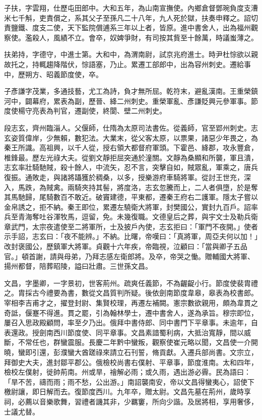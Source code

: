 \begin{pinyinscope}
 子扶，字雲翔，仕歷屯田郎中。大和五年，為山南宣撫使。內鄉倉督鄧琬負度支漕米七千斛，吏責償之，系其父子至孫凡二十八年，九人死於獄，扶奏申釋之。詔切責鹽鐵、度支二使，天下監院償逋系三年以上者，皆原。進中書舍人，出為福州觀察使。濫殺人，風績不立。會卒，奴婢爭財，有司按其貲至十餘萬，時議蚩薄之。



 扶弟持，字德守，中進士第。大和中，為渭南尉，試京兆府進士。時尹杜悰欲以親故托之，持輒趨降階伏，悰語塞，乃止。累遷工部郎中，出為容州刺史。遷給事中，歷朔方、昭義節度使，卒。



 子彥謙字茂業，多通技藝，尤工為詩，負才無所屈。乾符末，避亂漢南。王重榮鎮河中，闢幕府，累表為副，歷晉、絳二州刺史。重榮軍亂、彥謙貶興元參軍事。節度使楊守亮表為判官，遷副使，終閬、壁二州刺史。



 段志玄，齊州臨淄人。父偃師，仕隋為太原司法書佐。從義師，官至郢州刺史。志玄姿質偉岸，少無賴，數犯法。大業末，從父客太原，以票果，諸惡少年畏之，為秦王所識。高祖興，以千人從，授右領大都督府軍頭。下霍邑、絳郡，攻永豐倉，椎鋒最。歷左光祿大夫。從劉文靜拒屈突通於潼關。文靜為桑顯和所襲，軍且潰，志玄率壯騎馳賊，殺十餘人，中流矢，忍不言，突擊自如，賊眾亂，軍乘之，唐兵復振。通敗走，與諸將躡獲於稠桑，以多，授樂游府車騎將軍。從討王世充，深入，馬跌，為賊禽。兩騎夾持其髻，將度洛，志玄忽騰而上，二人者俱墮，於是奪其馬馳歸，尾騎數百不敢近。破竇建德，平東都，遷秦王府右二護軍。隱太子嘗以金帛誘之，拒不納。秦王即位，累遷左驍衛大將軍，封樊國公，實封九百戶。詔率兵至青海奪吐谷渾牧馬，逗留，免。未幾復職。文德皇后之葬，與宇文士及勒兵衛章武門，太宗夜遣使至二將軍所，士及披戶內使，志玄拒曰：「軍門不夜開。」使者示手詔，志玄曰：「夜不能辨。」不納。比曙，帝嘆曰：「真將軍，周亞夫何以加！」改封褒國公，歷鎮軍大將軍。貞觀十六年疾，帝臨視，泣顧曰：「當與卿子五品官。」頓首謝，請與母弟，乃拜志感左衛郎將。及卒，帝哭之慟。贈輔國大將軍、揚州都督，陪葬昭陵，謚曰壯肅。三世孫文昌。



 文昌，字墨卿，一字景初，世客荊州。疏爽任義節，不為齷齪小行。節度使裴胄禮之。胄採古今禮要為書，數從文昌質判所疑。後依劍南節度韋皋，皋表為校書郎。宰相李吉甫才之，擢登封尉、集賢校理，再遷左補闕。憲宗數欲親用，頗為韋貫之奇詆，偃蹇不得進。貫之罷，引為翰林學士，遷中書舍人，遂為承旨。穆宗即位，屢召入思政殿顧問，率至夕乃出。俄拜中書侍郎、同中書門下平章事。未逾年，自表還政。授劍南西川節度使、同平章事。文昌素諳蜀利病，大抵治寬靜，間以威斷，不常任也，群蠻震服。長慶二年黔中蠻叛，觀察使崔元略以聞，文昌使一介開曉，蠻即引還，彭濮蠻大酋蹉祿來請立石刊誓，脩貢獻。入遷兵部尚書。文宗立，拜御史大夫，進封鄒平郡公。俄檢校尚書右僕射、平章事，節度淮南。太和四年，檢校左僕射，徙帥荊南。州或旱，禬解必雨；或久雨，遇出游必霽。民為語曰：「旱不苦，禱而雨；雨不愁，公出游。」南詔襲南安，帝以文昌得蠻夷心，詔使下檄尉讓，即日解而去。復節度西川。九年卒，贈太尉。文昌先墓在荊州，歲時享祠，必薦以音樂歌舞，習禮者譏其非，少羈窶，所向少諧。及居將相，享用奢侈，士議尤替。




\end{pinyinscope}
